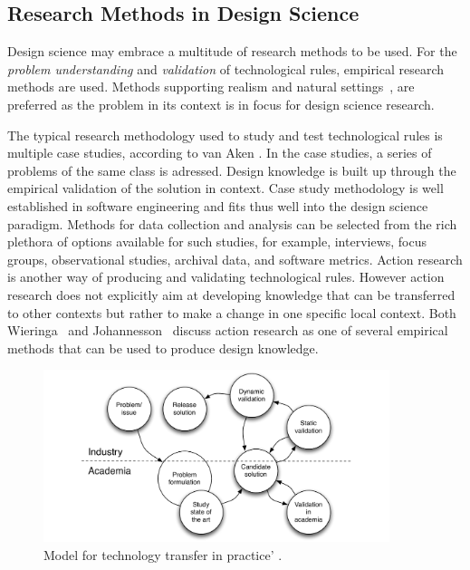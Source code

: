 \documentclass[graybox]{svmult}
\begin{document}
\subsection{Research Methods in Design Science} 


Design science %
may embrace a multitude of research methods to be used. For the \emph{problem understanding} and \emph{validation} of technological rules, empirical research methods are used. Methods supporting realism and natural settings~\cite{StolABC18}, are preferred as the problem in its context is in focus for design science research. 

The typical research methodology used to study and test technological rules is multiple case studies, according to van Aken \cite{van_aken_management_2004}. In the case studies, a series of problems of the same class is adressed. Design knowledge is built up through the empirical validation of the solution in context. Case study methodology is well established in software engineering \cite{Runeson12Case} and fits thus well into the design science paradigm. Methods for data collection and analysis can be selected from the rich plethora of options available for such studies, for example, interviews, focus groups, observational studies, archival data, and software metrics. Action research is another way of producing and validating technological rules. However action research does not explicitly aim at developing knowledge that can be transferred to other contexts but rather to make a change in one specific local context. Both Wieringa~\cite{wieringa_technical_2012} and Johannesson~\cite{johannesson_introduction_2014} discuss action research as one of several empirical methods that can be used to produce design knowledge.


\begin{figure}
  \includegraphics[width=0.9\textwidth]{Figures/GorschekModel.pdf}
\caption{Model for technology transfer in practice' \cite{GorschekSW2006}.}
\label{fig:GorschekModel}       %
\end{figure}
\end{document}
